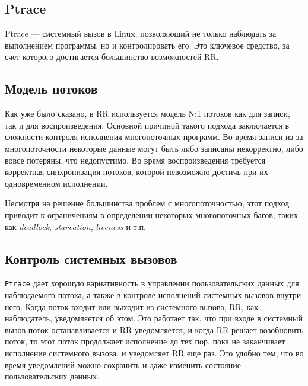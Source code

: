 
\subsection{Ptrace}

Ptrace — системный вызов в Linux, позволяющий не только наблюдать за выполнением программы, 
но и контролировать его. Это ключевое средство, за счет которого 
достигается большинство возможностей RR.

\subsection{Модель потоков}

Как уже было сказано, в RR используется модель N:1 потоков как для записи, 
так и для воспроизведения. Основной причиной такого подхода заключается в сложности 
контроля исполнения многопоточных программ. Во время записи из-за многопоточности некоторые данные могут быть либо записаны некорректно, 
либо вовсе потеряны, что недопустимо. Во время воспроизведения требуется корректная синхронизация потоков, 
которой невозможно достичь при их одновременном исполнении.

Несмотря на решение большинства проблем с многопоточностью, этот подход приводит к ограничениям в определении 
некоторых многопоточных багов, таких как \textit{deadlock}, \textit{starvation}, \textit{liveness} и т.п.

\subsection{Контроль системных вызовов}

\texttt{Ptrace} дает хорошую вариативность в управлении пользовательских данных для наблюдаемого потока, а также в контроле исполнений 
системных вызовов внутри него. Когда поток входит или выходит из системного вызова, RR, как наблюдатель, уведомляется об этом. 
Это работает так, что при входе в системный вызов поток останавливается и RR уведомляется, и когда RR решает возобновить поток, 
то этот поток продолжает исполнение до тех пор, пока не заканчивает исполнение системного вызова, и уведомляет RR еще раз. 
Это удобно тем, что во время уведомлений можно сохранить и даже изменить состояние пользовательских данных.

